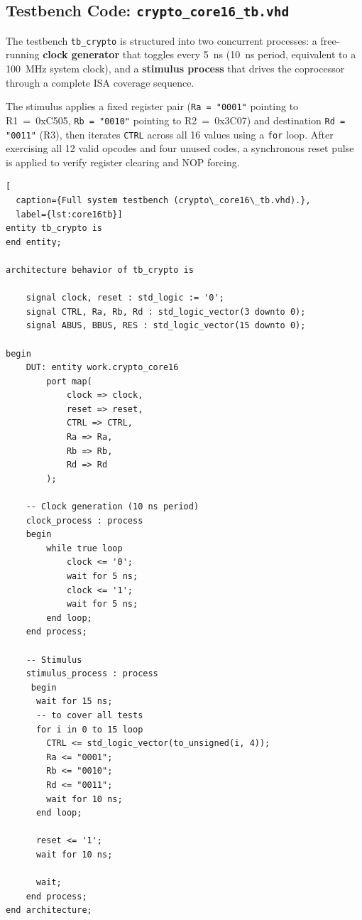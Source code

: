 \documentclass[12pt, a4paper]{report}
\begin{document}
\subsection{Testbench Code: \texttt{crypto\_core16\_tb.vhd}}

The testbench \texttt{tb\_crypto} is structured into two concurrent processes:
a free-running \textbf{clock generator} that toggles every 5~ns (10~ns period,
equivalent to a 100~MHz system clock), and a \textbf{stimulus process} that
drives the coprocessor through a complete ISA coverage sequence.

The stimulus applies a fixed register pair (\texttt{Ra = "0001"} pointing to
R1~=~0xC505, \texttt{Rb = "0010"} pointing to R2~=~0x3C07) and destination
\texttt{Rd = "0011"} (R3), then iterates \texttt{CTRL} across all 16 values
using a \texttt{for} loop. After exercising all 12 valid opcodes and four
unused codes, a synchronous reset pulse is applied to verify register
clearing and NOP forcing.

\begin{lstlisting}[
  caption={Full system testbench (crypto\_core16\_tb.vhd).},
  label={lst:core16tb}]
entity tb_crypto is
end entity;

architecture behavior of tb_crypto is

    signal clock, reset : std_logic := '0';
    signal CTRL, Ra, Rb, Rd : std_logic_vector(3 downto 0);	 
	signal ABUS, BBUS, RES : std_logic_vector(15 downto 0);

begin
    DUT: entity work.crypto_core16
        port map(
            clock => clock,
            reset => reset,
            CTRL => CTRL,
            Ra => Ra,
            Rb => Rb,
            Rd => Rd
        );

    -- Clock generation (10 ns period)
    clock_process : process
    begin
        while true loop
            clock <= '0';
            wait for 5 ns;
            clock <= '1';
            wait for 5 ns;
        end loop;
    end process;

    -- Stimulus
    stimulus_process : process
     begin
      wait for 15 ns;
	  -- to cover all tests
      for i in 0 to 15 loop
        CTRL <= std_logic_vector(to_unsigned(i, 4));
        Ra <= "0001";
        Rb <= "0010";
        Rd <= "0011";
        wait for 10 ns;
      end loop;
	  
	  reset <= '1';
	  wait for 10 ns;

      wait;
    end process; 
end architecture;
\end{lstlisting}
\end{document}
